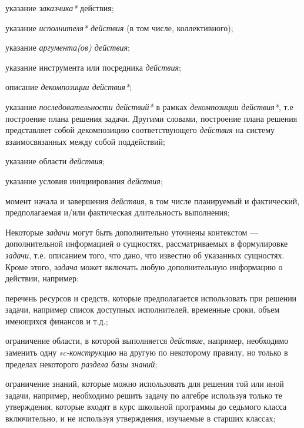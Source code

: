 \begin{SCn}
\begin{scnsubstruct}
{\begin{scnitemize}
                \item указание \textit{заказчика*} действия;
                \item указание \textit{исполнителя* действия} (в том числе, коллективного);
                \item указание \textit{аргумента(ов) действия\scnrolesign};
                \item указание инструмента или посредника \textit{действия};
                \item описание \textit{декомпозиции действия*};
                \item указание \textit{последовательности действий*} в рамках \textit{декомпозиции действия*}, т.е построение плана решения задачи. Другими словами, построение плана решения представляет собой декомпозицию соответствующего \textit{действия} на систему взаимосвязанных между собой поддействий;
                \item указание области \textit{действия};
                \item указание условия инициирования \textit{действия};
                \item момент начала и завершения \textit{действия}, в том числе планируемый и фактический, предполагаемая и/или фактическая длительность выполнения;
            \end{scnitemize}
            Некоторые \textit{задачи} могут быть дополнительно уточнены контекстом --- дополнительной информацией о сущностях, рассматриваемых в формулировке \textit{задачи}, т.е. описанием того, что дано, что известно об указанных сущностях.\\
            Кроме этого, \textit{задача} может включать любую дополнительную информацию о действии, например:
            \begin{scnitemize}
                \item перечень ресурсов и средств, которые предполагается использовать при решении задачи, например список доступных исполнителей, временные сроки, объем имеющихся финансов и т.д.;
                \item ограничение области, в которой выполняется \textit{действие}, например, необходимо заменить одну \textit{\mbox{sc-конструкцию}} на другую по некоторому правилу, но только в пределах некоторого \textit{раздела базы знаний};
                \item ограничение знаний, которые можно использовать для решения той или иной задачи, например, необходимо решить задачу по алгебре используя только те утверждения, которые входят в курс школьной программы до седьмого класса включительно, и не используя утверждения, изучаемые в старших классах;

\end{scnitemize}}
\end{scnsubstruct}
\end{SCn}
